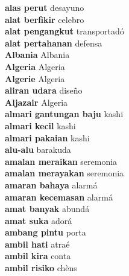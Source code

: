 \textbf{ alas perut  } desayuno \\
\textbf{ alat berfikir  } celebro \\
\textbf{ alat pengangkut  } transportadó \\
\textbf{ alat pertahanan  } defensa \\
\textbf{ Albania  } Albania \\
\textbf{ Algeria  } Algeria \\
\textbf{ Algerie  } Algeria \\
\textbf{ aliran udara  } diseño \\
\textbf{ Aljazair  } Algeria \\
\textbf{ almari gantungan baju  } kashi \\
\textbf{ almari kecil  } kashi \\
\textbf{ almari pakaian  } kashi \\
\textbf{ alu-alu  } barakuda \\
\textbf{ amalan meraikan  } seremonia \\
\textbf{ amalan merayakan  } seremonia \\
\textbf{ amaran bahaya  } alarmá \\
\textbf{ amaran kecemasan  } alarmá \\
\textbf{ amat banyak  } abundá \\
\textbf{ amat suka  } adorá \\
\textbf{ ambang pintu  } porta \\
\textbf{ ambil hati  } atraé \\
\textbf{ ambil kira  } conta \\
\textbf{ ambil risiko  } chèns \\
